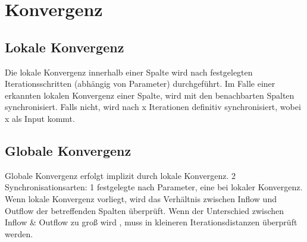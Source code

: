\section{Konvergenz}
\subsection{Lokale Konvergenz}
Die lokale Konvergenz innerhalb einer Spalte wird nach festgelegten Iterationsschritten (abhängig von Parameter) durchgeführt. Im Falle einer erkannten lokalen Konvergenz einer Spalte, wird mit den benachbarten Spalten synchronisiert. Falls nicht, wird nach x Iterationen definitiv synchronisiert, wobei x als Input kommt. 

\subsection{Globale Konvergenz}
Globale Konvergenz erfolgt implizit durch lokale Konvergenz. 
2 Synchronisationsarten: 1 festgelegte nach Parameter, eine bei lokaler Konvergenz.
Wenn lokale Konvergenz vorliegt, wird das Verhältnis zwischen Inflow und Outflow der betreffenden Spalten überprüft. Wenn der  Unterschied zwischen Inflow \& Outflow zu groß wird , muss in kleineren Iterationsdistanzen überprüft werden. 


